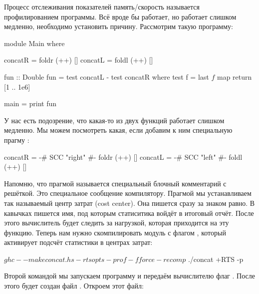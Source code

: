 Процесс отслеживания показателей память/скорость 
называется профилированием программы. Всё вроде бы работает,
но работает слишком медленно, необходимо установить причину.
Рассмотрим такую программу:

\begin{code}
module Main where

concatR = foldr (++) [] 
concatL = foldl (++) []

fun :: Double
fun = test concatL - test concatR
    where test f = last $ f $ map return [1 .. 1e6]

main = print fun
\end{code}

У нас есть подозрение, что какая-то из двух функций 
 работает слишком медленно.  Мы можем
посмотреть какая, если добавим к ним специальную прагму :

\begin{code}
concatR = {-# SCC "right" #-} foldr (++) [] 
concatL = {-# SCC "left"  #-} foldl (++) []
\end{code}

Напомню, что прагмой называется специальный блочный комментарий
с решёткой. Это специальное сообщение компилятору. Прагмой
 мы устанавливаем так называемый центр затрат (cost center).
Она пишется сразу за знаком равно. В кавычках пишется имя, под
которым статиситика войдёт в итоговый отчёт. 
После этого вычислитель будет следить
за нагрузкой, которая приходится на эту функцию.
Теперь нам нужно скомпилировать модуль с флагом ,
который активирует подсчёт статистики в центрах затрат:

\begin{code}
$ ghc --make concat.hs -rtsopts -prof -fforce-recomp
$ ./concat +RTS -p
\end{code}
  
Второй командой мы запускаем программу и передаём вычислителю флаг .
После этого будет создан файл . Откроем этот файл:

